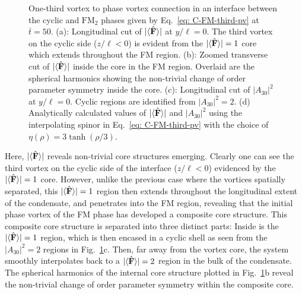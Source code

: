 \begin{figure}
    \caption[Dynamics of a one-third vortex to singly quantised vortex
    connection in a cyclic to ferromagnetic interface]
    {\label{fig: C-FM-third-SQV}One-third vortex to phase vortex connection in
    an interface between the cyclic and \(\text{FM}_2\) phases given by
    Eq.~\eqref{eq: C-FM-third-pv} at \(\bar{t} = 50\).
    (a): Longitudinal cut of \(|\langle \hat{\vb{F}} \rangle | \) at \(y/\ell=0\).
    The third vortex on the cyclic side (\(z/\ell < 0\)) is evident from the
    \(|\langle \hat{\vb{F}} \rangle | = 1\) core which extends throughout the FM region.
    (b): Zoomed transverse cut of \(|\langle \hat{\vb{F}} \rangle | \) inside the core in the FM
    region.
    Overlaid are the spherical harmonics showing the non-trivial change
    of order parameter symmetry inside the core.
    (c): Longitudinal cut of \(|A_{30}|^2\) at \(y/\ell=0\).
    Cyclic regions are identified from \(|A_{30}|^2=2\).
    (d) Analytically calculated values of \(|\langle \hat{\vb{F}} \rangle | \) and \(|A_{30}|^2\)
    using the interpolating spinor in Eq.~\eqref{eq: C-FM-third-pv} with the
    choice of \(\eta(\rho) = 3\tanh(\rho/3)\).}
\end{figure}
Here, \(|\langle \hat{\vb{F}} \rangle | \) reveals non-trivial core structures emerging.
Clearly one can see the third vortex on the cyclic side of the interface
(\(z/\ell < 0\)) evidenced by the \(|\langle \hat{\vb{F}} \rangle | = 1\) core.
However, unlike the previous case where the vortices spatially separated, this
\(|\langle \hat{\vb{F}} \rangle | = 1\) region then extends throughout the longitudinal extent of the
condensate, and penetrates into the FM region, revealing that the initial phase
vortex of the FM phase has developed a composite core structure.
This composite core structure is separated into three distinct parts:
Inside is the \(|\langle \hat{\vb{F}} \rangle | = 1\) region, which is then encased in a cyclic shell
as seen from the \(|A_{30}|^2=2\) regions in Fig.~\ref{fig: C-FM-third-SQV}c.
Then, far away from the vortex core, the system smoothly interpolates back to
a \(|\langle \hat{\vb{F}} \rangle | = 2\) region in the bulk of the condensate.
The spherical harmonics of the internal core structure plotted in
Fig.~\ref{fig: C-FM-third-SQV}b reveal the non-trivial change of order parameter
symmetry within the composite core.

